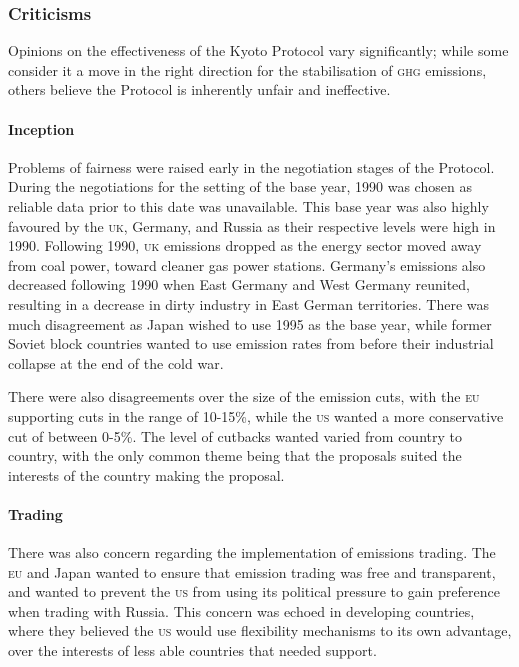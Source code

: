 \subsubsection{Criticisms}

Opinions on the effectiveness of the Kyoto Protocol vary significantly; while some consider it a move in the right direction for the stabilisation of \textsc{ghg} emissions, others believe the Protocol is inherently unfair and ineffective.

\paragraph{Inception}
Problems of fairness were raised early in the negotiation stages of the Protocol. During the negotiations for the setting of the base year, 1990 was chosen as reliable data prior to this date was unavailable. This base year was also highly favoured by the \textsc{uk}, Germany, and Russia as their respective \CO levels were high in 1990. Following 1990, \textsc{uk} emissions dropped as the energy sector moved away from coal power, toward cleaner gas power stations. Germany's \CO emissions also decreased following 1990 when East Germany and West Germany reunited, resulting in a decrease in dirty industry in East German territories. There was much disagreement as Japan wished to use 1995 as the base year, while former Soviet block countries wanted to use emission rates from before their industrial collapse at the end of the cold war.

There were also disagreements over the size of the emission cuts, with the \textsc{eu} supporting cuts in the range of 10-15\%, while the \textsc{us} wanted a more conservative cut of between 0-5\%. The level of cutbacks wanted varied from country to country, with the only common theme being that the proposals suited the interests of the country making the proposal.~\cite{Grubb-economics}

\paragraph{Trading}
There was also concern regarding the implementation of emissions trading. The \textsc{eu} and Japan wanted to ensure that emission trading was free and transparent, and wanted to prevent the \textsc{us} from using its political pressure to gain preference when trading with Russia. This concern was echoed in developing countries, where they believed the \textsc{us} would use flexibility mechanisms to its own advantage, over the interests of less able countries that needed support.

